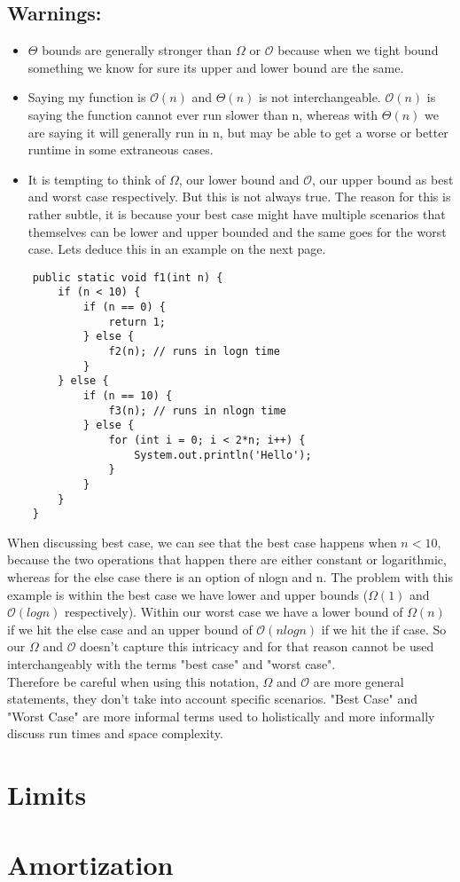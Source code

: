 \documentclass{article}
\begin{document}
\subsection*{Warnings:}
\begin{itemize}
    \item $\Theta$ bounds are generally stronger than $\Omega$ or $\mathcal{O}$ because when we tight bound something we know for sure its upper and lower bound are the same. 
    \item Saying my function is $\mathcal{O}(n)$ and $\Theta(n)$ is not interchangeable. $\mathcal{O}(n)$ is saying the function cannot ever run slower than n, whereas with $\Theta(n)$ we are saying it will generally run in n, but may be able to get a worse or better runtime in some extraneous cases. 
    \item It is tempting to think of $\Omega$, our lower bound and $\mathcal{O}$, our upper bound as best and worst case respectively. But this is not always true. The reason for this is rather subtle, it is because your best case might have multiple scenarios that themselves can be lower and upper bounded and the same goes for the worst case. Lets deduce this in an example on the next page.
\end{itemize}
\newpage
\begin{lstlisting}
    public static void f1(int n) {
        if (n < 10) {
            if (n == 0) {
                return 1;
            } else {
                f2(n); // runs in logn time
            }
        } else {
            if (n == 10) {
                f3(n); // runs in nlogn time
            } else {
                for (int i = 0; i < 2*n; i++) {
                    System.out.println('Hello');
                }
            }
        }
    }
\end{lstlisting}
When discussing best case, we can see that the best case happens when $n < 10$, because the two operations that happen there are either constant or logarithmic, whereas for the else case there is an option of nlogn and n. The problem with this example is within the best case we have lower and upper bounds ($\Omega(1)$ and $\mathcal{O}(logn)$ respectively). Within our worst case we have a lower bound of $\Omega(n)$ if we hit the else case and an upper bound of $\mathcal{O}(nlogn)$ if we hit the if case. So our $\Omega$ and $\mathcal{O}$ doesn't capture this intricacy and for that reason cannot be used interchangeably with the terms "best case" and "worst case". \\
Therefore be careful when using this notation, $\Omega$ and $\mathcal{O}$ are more general statements, they don't take into account specific scenarios. "Best Case" and "Worst Case" are more informal terms used to holistically and more informally discuss run times and space complexity. 

\section{Limits}
\section{Amortization}
\end{document}
